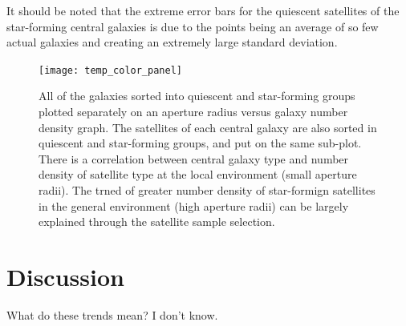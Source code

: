 \documentclass[apj]{emulateapj}
\begin{document}
It should be noted that the extreme error bars for the quiescent satellites of the star-forming central galaxies is due to the points being an average of so few actual galaxies and creating an extremely large standard deviation. 

\begin{figure}
\centering
\graphicspath{{C:/3d_hst/2015_finals/Colors/}}
\texttt{[image: temp\_color\_panel]}
\caption{\footnotesize All of the galaxies sorted into quiescent and star-forming groups plotted separately on an aperture radius versus galaxy number density graph. The satellites of each central galaxy are also sorted in quiescent and star-forming groups, and put on the same sub-plot. There is a correlation between central galaxy type and number density of satellite type at the local environment (small aperture radii). The trned of greater number density of star-formign satellites in the general environment (high aperture radii) can be largely explained through the satellite sample selection.}
\label{fig:color_panel}
\end{figure}

\section{Discussion}

What do these trends mean? I don't know.


\acknowledgements

\appendix



\end{document}
